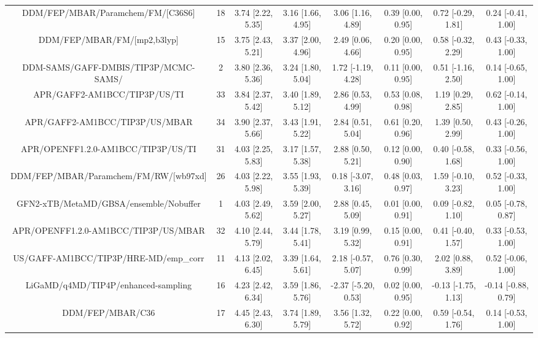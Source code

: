 \documentclass[8pt]{article}
\begin{document}
\begin{center}
\begin{footnotesize}
\begin{longtable}{|cccccccc|}
        DDM/FEP/MBAR/Paramchem/FM/[C36S6] &  18 &   3.74 [2.22, 5.35] &   3.16 [1.66, 4.95] &     3.06 [1.16, 4.89] &  0.39 [0.00, 0.95] &   0.72 [-0.29, 1.81] &   0.24 [-0.41, 1.00] \\
              DDM/FEP/MBAR/FM/[mp2,b3lyp] &  15 &   3.75 [2.43, 5.21] &   3.37 [2.00, 4.96] &     2.49 [0.06, 4.66] &  0.20 [0.00, 0.95] &   0.58 [-0.32, 2.29] &   0.43 [-0.33, 1.00] \\
     DDM-SAMS/GAFF-DMBIS/TIP3P/MCMC-SAMS/ &   2 &   3.80 [2.36, 5.36] &   3.24 [1.80, 5.04] &    1.72 [-1.19, 4.28] &  0.11 [0.00, 0.95] &   0.51 [-1.16, 2.50] &   0.14 [-0.65, 1.00] \\
             APR/GAFF2-AM1BCC/TIP3P/US/TI &  33 &   3.84 [2.37, 5.42] &   3.40 [1.89, 5.12] &     2.86 [0.53, 4.99] &  0.53 [0.08, 0.98] &    1.19 [0.29, 2.85] &   0.62 [-0.14, 1.00] \\
           APR/GAFF2-AM1BCC/TIP3P/US/MBAR &  34 &   3.90 [2.37, 5.66] &   3.43 [1.91, 5.22] &     2.84 [0.51, 5.04] &  0.61 [0.20, 0.96] &    1.39 [0.50, 2.99] &   0.43 [-0.26, 1.00] \\
       APR/OPENFF1.2.0-AM1BCC/TIP3P/US/TI &  31 &   4.03 [2.25, 5.83] &   3.17 [1.57, 5.38] &     2.88 [0.50, 5.21] &  0.12 [0.00, 0.90] &   0.40 [-0.58, 1.68] &   0.33 [-0.56, 1.00] \\
    DDM/FEP/MBAR/Paramchem/FM/RW/[wb97xd] &  26 &   4.03 [2.22, 5.98] &   3.55 [1.93, 5.39] &    0.18 [-3.07, 3.16] &  0.48 [0.03, 0.97] &   1.59 [-0.10, 3.23] &   0.52 [-0.33, 1.00] \\
   GFN2-xTB/MetaMD/GBSA/ensemble/Nobuffer &   1 &   4.03 [2.49, 5.62] &   3.59 [2.00, 5.27] &     2.88 [0.45, 5.09] &  0.01 [0.00, 0.91] &   0.09 [-0.82, 1.10] &   0.05 [-0.78, 0.87] \\
     APR/OPENFF1.2.0-AM1BCC/TIP3P/US/MBAR &  32 &   4.10 [2.44, 5.79] &   3.44 [1.78, 5.41] &     3.19 [0.99, 5.32] &  0.15 [0.00, 0.91] &   0.41 [-0.40, 1.57] &   0.33 [-0.53, 1.00] \\
    US/GAFF-AM1BCC/TIP3P/HRE-MD/emp\_corr &  11 &   4.13 [2.02, 6.45] &   3.39 [1.64, 5.61] &    2.18 [-0.57, 5.07] &  0.76 [0.30, 0.99] &    2.02 [0.88, 3.89] &   0.52 [-0.06, 1.00] \\
      LiGaMD/q4MD/TIP4P/enhanced-sampling &  16 &   4.23 [2.42, 6.34] &   3.59 [1.86, 5.76] &   -2.37 [-5.20, 0.53] &  0.02 [0.00, 0.95] &  -0.13 [-1.75, 1.13] &  -0.14 [-0.88, 0.79] \\
                         DDM/FEP/MBAR/C36 &  17 &   4.45 [2.43, 6.30] &   3.74 [1.89, 5.79] &     3.56 [1.32, 5.72] &  0.22 [0.00, 0.92] &   0.59 [-0.54, 1.76] &   0.14 [-0.53, 1.00] \\

\end{longtable}
\end{footnotesize}
\end{center}
\end{document}
